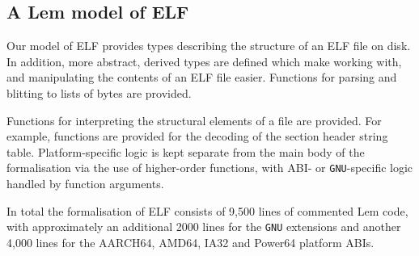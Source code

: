 


\subsection{A Lem model of ELF}
\label{subsect.lem.model.of.elf}

Our model of ELF provides types describing the structure of an ELF file on disk.
In addition, more abstract, derived types are defined which make working with, and manipulating the contents of an ELF file easier.
Functions for parsing and blitting to lists of bytes are provided.

Functions for interpreting the structural elements of a file are provided.
For example, functions are provided for the decoding of the section header string table.
Platform-specific logic is kept separate from the main body of the formalisation via the use of higher-order functions, with ABI- or \texttt{GNU}-specific logic handled by function arguments.

In total the formalisation of ELF consists of 9,500 lines of commented Lem code, with approximately an additional 2000 lines for the \texttt{GNU} extensions and another 4,000 lines for the AARCH64, AMD64, IA32 and Power64 platform ABIs.

